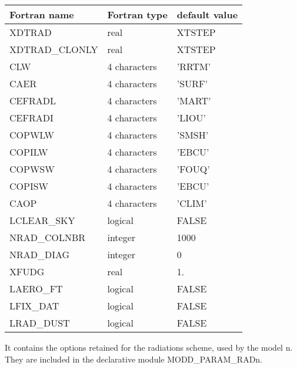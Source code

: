 \begin{center}
\begin{tabular} {|l|l|l|}
\hline
Fortran name & Fortran type & default value \\
\hline
XDTRAD         &  real          & XTSTEP \\
XDTRAD\_CLONLY &  real          & XTSTEP \\
CLW            &  4 characters  & 'RRTM'   \\
CAER           &  4 characters  & 'SURF'   \\
CEFRADL        &  4 characters  & 'MART'   \\
CEFRADI        &  4 characters  & 'LIOU'   \\
COPWLW         &  4 characters  & 'SMSH'   \\
COPILW         &  4 characters  & 'EBCU'   \\
COPWSW         &  4 characters  & 'FOUQ'   \\
COPISW         &  4 characters  & 'EBCU'   \\
CAOP           &  4 characters  & 'CLIM'   \\
LCLEAR\_SKY    & logical        & FALSE  \\
NRAD\_COLNBR   & integer        & 1000   \\
NRAD\_DIAG     & integer        & 0  \\
XFUDG          & real           &   1.   \\
LAERO\_FT      & logical        & FALSE  \\
LFIX\_DAT      & logical        & FALSE  \\
LRAD\_DUST     & logical        & FALSE  \\
\hline
\end{tabular}
\end{center}

It contains the options retained for the radiations scheme, used by the 
model n. They are
included in the declarative module MODD\_PARAM\_RADn.

